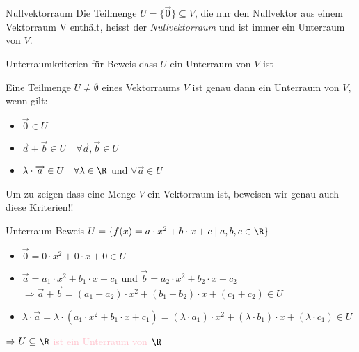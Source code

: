     \begin{definition}{Nullvektorraum}
        Die Teilmenge $U=\{\vec{0}\}\subseteq V$, die nur den Nullvektor aus einem Vektorraum V enthält, 
        heisst der \textit{Nullvektorraum} und ist immer ein Unterraum von $V$.
    \end{definition}

    \begin{KR}{Unterraumkriterien} {\small für Beweis dass $U$ ein Unterraum von $V$ ist}

        \vspace{1mm}

        Eine Teilmenge $U\neq\emptyset$ eines Vektorraums $V$ ist genau dann ein Unterraum von $V$, wenn gilt:

        \begin{minipage}{0.5\linewidth}
        \begin{itemize}
            \item $\overrightarrow{0} \in U$
            \item $\overrightarrow{a} + \overrightarrow{b} \in U \quad \forall \vec{a}, \vec{b} \in U$
            \item $\lambda \cdot \overrightarrow{a} \in U \quad \forall \lambda \in \R$ und $\forall \vec{a} \in U$
        \end{itemize}
        \end{minipage}
        \hspace{2mm}
        \begin{minipage}{0.4\linewidth}
        {\small \raggedleft Um zu zeigen dass eine Menge $V$ ein Vektorraum ist, beweisen wir genau auch diese Kriterien!!}
        \end{minipage}
    \end{KR}

    \begin{example2}{Unterraum Beweis}
        $U = \{f(x) = a \cdot x^2 + b \cdot x + c \mid a, b, c \in \R\}$

        \vspace{1mm}

        \begin{itemize}
            \item $\overrightarrow{0} = 0 \cdot x^2 + 0 \cdot x + 0 \in U$
            \item $\overrightarrow{a} = a_1 \cdot x^2 + b_1 \cdot x + c_1$ und $\overrightarrow{b} = a_2 \cdot x^2 + b_2 \cdot x + c_2$\\
                $\Rightarrow \overrightarrow{a} + \overrightarrow{b} = (a_1 + a_2) \cdot x^2 + (b_1 + b_2) \cdot x + (c_1 + c_2) \in U$
            \item $\lambda \cdot \overrightarrow{a} = \lambda \cdot (a_1 \cdot x^2 + b_1 \cdot x + c_1) = (\lambda \cdot a_1) \cdot x^2 + (\lambda \cdot b_1) \cdot x + (\lambda \cdot c_1) \in U$
        \end{itemize}
        \textcolor{pink}{$\Rightarrow U \subseteq \R$ ist ein Unterraum von $\R$}
    \end{example2}







